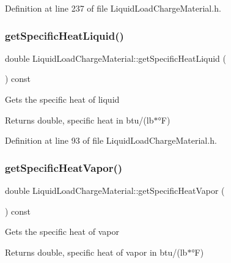 Definition at line 237 of file Liquid\+Load\+Charge\+Material.\+h.

\mbox{\label{class_liquid_load_charge_material_aa698f1f73dff91951139a4a50582963d}} 
\subsubsection{\texorpdfstring{get\+Specific\+Heat\+Liquid()}{getSpecificHeatLiquid()}}
{\footnotesize\ttfamily double Liquid\+Load\+Charge\+Material\+::get\+Specific\+Heat\+Liquid (\begin{DoxyParamCaption}{ }\end{DoxyParamCaption}) const\hspace{0.3cm}{\ttfamily [inline]}}

Gets the specific heat of liquid \begin{DoxyReturn}{Returns}
double, specific heat in btu/(lb$\ast$°F) 
\end{DoxyReturn}


Definition at line 93 of file Liquid\+Load\+Charge\+Material.\+h.

\mbox{\label{class_liquid_load_charge_material_ac4538f9722bf25465ec86586469a7b1e}} 
\subsubsection{\texorpdfstring{get\+Specific\+Heat\+Vapor()}{getSpecificHeatVapor()}}
{\footnotesize\ttfamily double Liquid\+Load\+Charge\+Material\+::get\+Specific\+Heat\+Vapor (\begin{DoxyParamCaption}{ }\end{DoxyParamCaption}) const\hspace{0.3cm}{\ttfamily [inline]}}

Gets the specific heat of vapor \begin{DoxyReturn}{Returns}
double, specific heat of vapor in btu/(lb$\ast$°F) 
\end{DoxyReturn}


